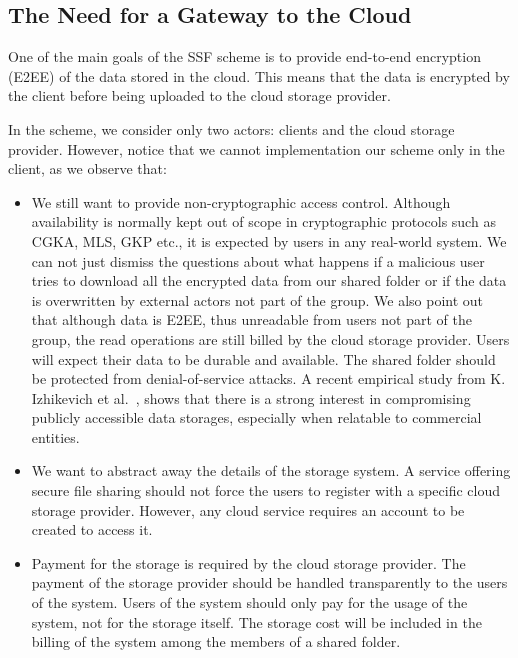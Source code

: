 \subsection{The Need for a Gateway to the Cloud}\label{sc:cloud-storage-access-and-billing}
One of the main goals of the SSF scheme is to provide
end-to-end encryption (E2EE) of the data stored in the cloud.
This means that the data is encrypted by the client before
being uploaded to the cloud storage provider.

In the scheme, we consider only two actors:
clients and the cloud storage provider.
However, notice that we cannot implementation
our scheme only in the client, as we observe that:
\begin{itemize}
    \item We still want to provide non-cryptographic access control. 
    Although availability is normally kept out of scope in cryptographic 
    protocols such as CGKA, MLS, GKP etc., it is expected by users
    in any real-world system. We can not just dismiss the questions about
    what happens if a malicious user tries to download all the encrypted
    data from our shared folder or if the data is overwritten by external
    actors not part of the group. We also point out that although 
    data is E2EE, thus unreadable from users not part of the group,
    the read operations are still billed by the cloud storage provider.
    Users will expect their data to be durable
    and available. The shared folder should be protected from
    denial-of-service attacks. 
    A recent empirical study from K. Izhikevich et al.~\cite{izhikevich2023using},
    shows that there is a strong interest
    in compromising publicly accessible data storages,
    especially when relatable to commercial entities.
    \item We want to abstract away the details of the storage system.
    A service offering secure file sharing should not force the users
    to register with a specific cloud storage provider. However,
    any cloud service requires an account to be created to access it.
    \item Payment for the storage is required by the cloud storage provider.
    The payment of the storage provider should be handled transparently to the users of the system. Users of the system should only pay
    for the usage of the system, not for the storage itself. The storage
    cost will be included in the billing of the system among the members
    of a shared folder.
\end{itemize} 


